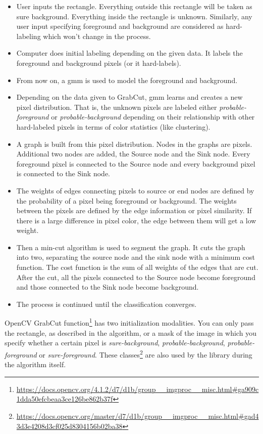 \begin{itemize}
	\item User inputs the rectangle. Everything outside this rectangle will be taken as sure background. Everything inside the rectangle is unknown. Similarly, any user input specifying foreground and background are considered as hard-labeling which won't change in the process.
	\item Computer does initial labeling depending on the given data. It labels the foreground and background pixels (or it hard-labels).
	\item From now on, a \gls{gmm} is used to model the foreground and background.
	\item Depending on the data given to GrabCut, \gls{gmm} learns and creates a new pixel distribution. That is, the unknown pixels are labeled either \textit{probable-foreground} or \textit{probable-background} depending on their relationship with other hard-labeled pixels in terms of color statistics (like clustering).
	\item A graph is built from this pixel distribution. Nodes in the graphs are pixels. Additional two nodes are added, the Source node and the Sink node. Every foreground pixel is connected to the Source node and every background pixel is connected to the Sink node.
	\item The weights of edges connecting pixels to source or end nodes are defined by the probability of a pixel being foreground or background. The weights between the pixels are defined by the edge information or pixel similarity. If there is a large difference in pixel color, the edge between them will get a low weight.
	\item Then a min-cut algorithm is used to segment the graph. It cuts the graph into two, separating the source node and the sink node with a minimum cost function. The cost function is the sum of all weights of the edges that are cut. After the cut, all the pixels connected to the Source node become foreground and those connected to the Sink node become background.
	\item The process is continued until the classification converges.
\end{itemize}


OpenCV GrabCut function\footnote{\url{https://docs.opencv.org/4.1.2/d7/d1b/group__imgproc__misc.html\#ga909c1dda50efcbeaa3ce126be862b37f}} has two initialization modalities. You can only pass the rectangle, as described in the algorithm, or a mask of the image in which you specify whether a certain pixel is \textit{sure-background}, \textit{probable-background}, \textit{probable-foreground} or \textit{sure-foreground}. These classes\footnote{\url{https://docs.opencv.org/master/d7/d1b/group__imgproc__misc.html\#gad43d3e4208d3cf025d8304156b02ba38}} are also used by the library during the algorithm itself. 

